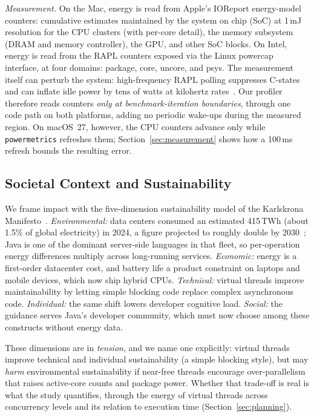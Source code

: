 \documentclass[sigconf,nonacm]{acmart}
\newcommand{\changed}[1]{#1}
\begin{document}
\emph{Measurement.} \changed{On the Mac, energy is read from Apple's IOReport energy-model counters: cumulative estimates maintained by the system on chip (SoC) at 1\,mJ resolution for the CPU clusters (with per-core detail), the memory subsystem (DRAM and memory controller), the GPU, and other SoC blocks. On Intel,} energy is read from the RAPL counters exposed via the Linux powercap interface, at four domains: package, core, uncore, and psys. The measurement itself can perturb the system: high-frequency RAPL polling suppresses C-states and can inflate idle power by tens of watts at kilohertz rates~\cite{raffin2025dissecting}. Our profiler therefore reads counters \emph{only at benchmark-iteration boundaries}\changed{, through one code path on both platforms}, adding no periodic wake-ups during the measured region. \changed{On macOS~27, however, the CPU counters advance only while \texttt{powermetrics} refreshes them; Section~\ref{sec:measurement} shows how a 100\,ms refresh bounds the resulting error.}

\subsection{Societal Context and Sustainability}\label{sec:societal}
We frame impact with the five-dimension sustainability model of the Karlskrona Manifesto~\cite{becker2015karlskrona}. \emph{Environmental:} data centers consumed an estimated 415\,TWh (about 1.5\% of global electricity) in 2024, a figure projected to roughly double by 2030~\cite{iea2025energyai}; Java is one of the dominant server-side languages in that fleet, so per-operation energy differences multiply across long-running services. \emph{Economic:} energy is a first-order datacenter cost, and battery life a product constraint on laptops and mobile devices\changed{, which now ship hybrid CPUs}. \emph{Technical:} virtual threads improve maintainability by letting simple blocking code replace complex asynchronous code. \emph{Individual:} the same shift lowers developer cognitive load. \emph{Social:} the guidance serves Java's developer community\changed{, which must now choose among these constructs without energy data}.

These dimensions are in \emph{tension}, and we name one explicitly: virtual threads improve technical and individual sustainability (a simple blocking style), but may \emph{harm} environmental sustainability if near-free threads encourage over-parallelism that raises active-core counts and package power. Whether that trade-off is real is what the study quantifies\changed{, through the energy of virtual threads across concurrency levels and its relation to execution time (Section~\ref{sec:planning})}.
\end{document}
